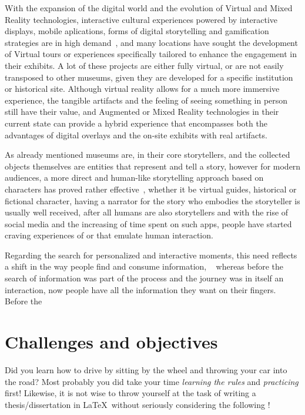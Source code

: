 With the expansion of the digital world and the evolution of Virtual and Mixed Reality technologies, interactive cultural experiences powered by
interactive displays, mobile aplications, forms of digital storytelling and gamification strategies are in high demand~\cite[pp. 105]{danks_interactive_2007}, and many locations
have sought the development of Virtual tours or experiences specifically tailored to enhance the engagement in their exhibits. A lot of these projects
are either fully virtual, or are not easily transposed to other museums, given they are developed for a specific institution or historical site.
Although virtual reality allows for a much more immersive experience, the tangible artifacts and the feeling of seeing something in person still have their value,
and Augmented or Mixed Reality technologies in their current state can provide a hybrid experience that encompasses both the advantages of digital overlays
and the on-site exhibits with real artifacts.

As already mentioned museums are, in their core storytellers, and the collected objects themselves are entities that represent and tell a story,
however for modern audiences, a more direct and human-like storytelling approach based on characters has proved rather effective~\cite{bekele_survey_2018},
whether it be virtual guides, historical or fictional character, having a narrator for the story who embodies the storyteller is usually well received,
after all humans are also storytellers and with the rise of social media and the increasing of time spent on such apps, people have started craving 
experiences of or that emulate human interaction.

Regarding the search for personalized and interactive moments, this need reflects a shift in the way people find and consume information, ~\cite{wyman_digital_2011}
whereas before the search of information was part of the process and the journey was in itself an interaction, now people have all the information they want
on their fingers. Before the 



\section{Challenges and objectives}
\label{sec:challenges_and_objectives}

Did you learn how to drive by sitting by the wheel and throwing your car into the road?  Most probably you did take your time \emph{learning the rules} and \emph{practicing} first! Likewise, it is not wise to throw yourself at the task of writing a thesis/dissertation in \LaTeX\ without seriously considering the following !

